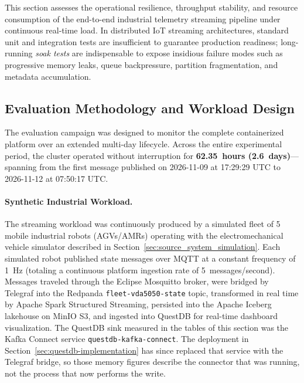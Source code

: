 
This section assesses the operational resilience, throughput stability, and resource consumption of the end-to-end industrial telemetry streaming pipeline under continuous real-time load. In distributed IoT streaming architectures, standard unit and integration tests are insufficient to guarantee production readiness; long-running \textit{soak tests} are indispensable to expose insidious failure modes such as progressive memory leaks, queue backpressure, partition fragmentation, and metadata accumulation.

\subsection{Evaluation Methodology and Workload Design}
\label{subsec:eval_methodology}

The evaluation campaign was designed to monitor the complete containerized platform over an extended multi-day lifecycle. Across the entire experimental period, the cluster operated without interruption for \textbf{62.35~hours (2.6~days)}---spanning from the first message published on 2026-11-09 at 17:29:29 UTC to 2026-11-12 at 07:50:17 UTC.

\paragraph{Synthetic Industrial Workload.}
The streaming workload was continuously produced by a simulated fleet of 5 mobile industrial robots (AGVs/AMRs) operating with the electromechanical vehicle simulator described in Section~\ref{sec:source_system_simulation}. Each simulated robot published state messages over MQTT at a constant frequency of 1~Hz (totaling a continuous platform ingestion rate of 5~messages/second). Messages traveled through the Eclipse Mosquitto broker, were bridged by Telegraf into the Redpanda \texttt{fleet-vda5050-state} topic, transformed in real time by Apache Spark Structured Streaming, persisted into the Apache Iceberg lakehouse on MinIO S3, and ingested into QuestDB for real-time dashboard visualization. The QuestDB sink measured in the tables of this section was the Kafka Connect service \texttt{questdb-kafka-connect}. The deployment in Section~\ref{sec:questdb-implementation} has since replaced that service with the Telegraf bridge, so those memory figures describe the connector that was running, not the process that now performs the write.

